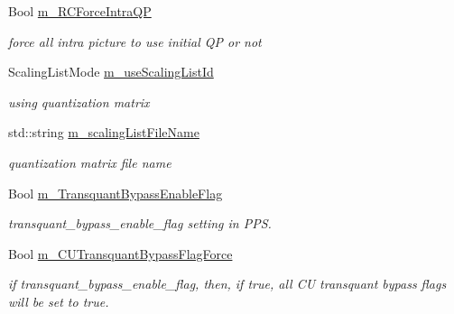 \begin{DoxyCompactItemize}
\mbox{\label{class_t_app_enc_cfg_aa82c89d15f6abc6f0d551cc27a77209a}} 
Bool \hyperlink{class_t_app_enc_cfg_aa82c89d15f6abc6f0d551cc27a77209a}{m\+\_\+\+R\+C\+Force\+Intra\+QP}
\begin{DoxyCompactList}\small\item\em force all intra picture to use initial QP or not \end{DoxyCompactList}\item 
\mbox{\label{class_t_app_enc_cfg_a66d508e197366304924de450a9ab3a78}} 
Scaling\+List\+Mode \hyperlink{class_t_app_enc_cfg_a66d508e197366304924de450a9ab3a78}{m\+\_\+use\+Scaling\+List\+Id}
\begin{DoxyCompactList}\small\item\em using quantization matrix \end{DoxyCompactList}\item 
\mbox{\label{class_t_app_enc_cfg_a7a0d2782a5d72a725ece20f7cf9ce6f7}} 
std\+::string \hyperlink{class_t_app_enc_cfg_a7a0d2782a5d72a725ece20f7cf9ce6f7}{m\+\_\+scaling\+List\+File\+Name}
\begin{DoxyCompactList}\small\item\em quantization matrix file name \end{DoxyCompactList}\item 
\mbox{\label{class_t_app_enc_cfg_a9ad952b0aee0258c51bfd18cc6684242}} 
Bool \hyperlink{class_t_app_enc_cfg_a9ad952b0aee0258c51bfd18cc6684242}{m\+\_\+\+Transquant\+Bypass\+Enable\+Flag}
\begin{DoxyCompactList}\small\item\em transquant\+\_\+bypass\+\_\+enable\+\_\+flag setting in P\+PS. \end{DoxyCompactList}\item 
\mbox{\label{class_t_app_enc_cfg_a2da7d1982ea6c1802b048d3ac2f3bf65}} 
Bool \hyperlink{class_t_app_enc_cfg_a2da7d1982ea6c1802b048d3ac2f3bf65}{m\+\_\+\+C\+U\+Transquant\+Bypass\+Flag\+Force}
\begin{DoxyCompactList}\small\item\em if transquant\+\_\+bypass\+\_\+enable\+\_\+flag, then, if true, all CU transquant bypass flags will be set to true. \end{DoxyCompactList}\item 

\end{DoxyCompactItemize}

